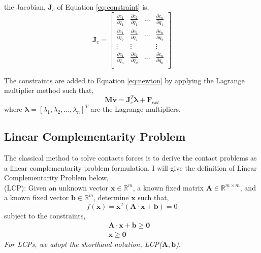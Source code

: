     the Jacobian, $\pmb{J}_{c}$ of Equation \ref{eq:constraint} is,
    \begin{equation}
        \pmb{J}_{c} = 
        \begin{bmatrix}
            \frac{\partial{c_1}}{\partial{q_1}} & \frac{\partial{c_2}}{\partial{q_1}} & ... & \frac{\partial{c_n}}{\partial{q_1}} \\
            \frac{\partial{c_1}}{\partial{q_2}} & \frac{\partial{c_2}}{\partial{q_2}} & ... & \frac{\partial{c_n}}{\partial{q_2}} \\
            \vdots & \vdots & & \vdots\\
            \frac{\partial{c_1}}{\partial{q_n}} & \frac{\partial{c_2}}{\partial{q_n}} & ... & \frac{\partial{c_n}}{\partial{q_n}} \\
        \end{bmatrix}
        \label{Jacobianb}
    \end{equation}

    The constraints are added to Equation \ref{eq:newton} by applying the Lagrange multiplier method such that,
    \begin{equation}
        \pmb{M}\dot{\mathbf{v}} = \pmb{J}_{c}^{T}\pmb{\lambda} + \mathbf{F}_{ext}
        \label{eq:cone}
    \end{equation}
    where $\pmb{\lambda} = [\lambda_1, \lambda_2, ... , \lambda_n]^T$ are the Lagrange multipliers.

\subsection{Linear Complementarity Problem}
The classical method to solve contacts forces is to derive the contact problems as a linear complementarity problem formulation. I will give the definition of Linear Complementarity Problem below, \\
    (LCP): Given an unknown vector $\mathbf{x} \in \mathbb{R}^{m}$, a known fixed matrix $\pmb{A} \in \mathbb{R}^{m\times m}$, and a known fixed vector $\pmb{b} \in \mathbb{R}^{m}$, determine $\mathbf{x}$ such that,
    \begin{equation}
        f(\mathbf{x}) = \mathbf{x}^{T}(\pmb{A}\cdot\mathbf{x} + \pmb{b}) = 0
    \end{equation}
    subject to the constraints,
    \begin{subequations}
    \begin{align}
        \pmb{A}\cdot\mathbf{x} + \pmb{b} \ge \pmb{0} & \\
        \mathbf{x} \ge \pmb{0} &
    \end{align}
    \end{subequations}
    \textit{For LCPs, we adopt the shorthand notation, LCP($\pmb{A}, \pmb{b}$)}.


